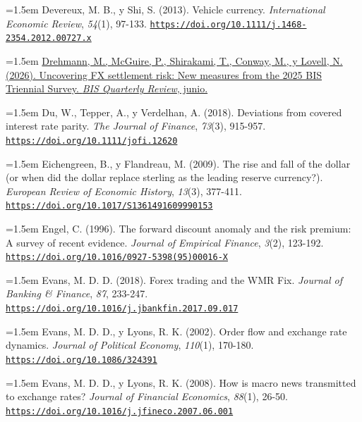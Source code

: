 \documentclass[10pt,a4paper]{article}
\begin{document}
\noindent\hangindent=1.5em Devereux, M. B., y Shi, S. (2013). Vehicle currency. \textit{International Economic Review}, \textit{54}(1), 97-133. \href{https://doi.org/10.1111/j.1468-2354.2012.00727.x}{\nolinkurl{https://doi.org/10.1111/j.1468-2354.2012.00727.x}}

\noindent\hangindent=1.5em \href{https://www.bis.org/publ/qtrpdf/r_qt2606c.htm}{Drehmann, M., McGuire, P., Shirakami, T., Conway, M., y Lovell, N. (2026). Uncovering FX settlement risk: New measures from the 2025 BIS Triennial Survey. \textit{BIS Quarterly Review}, junio.}

\noindent\hangindent=1.5em Du, W., Tepper, A., y Verdelhan, A. (2018). Deviations from covered interest rate parity. \textit{The Journal of Finance}, \textit{73}(3), 915-957. \href{https://doi.org/10.1111/jofi.12620}{\nolinkurl{https://doi.org/10.1111/jofi.12620}}

{\sloppy\noindent\hangindent=1.5em Eichengreen, B., y Flandreau, M. (2009). The rise and fall of the dollar (or when did the dollar replace sterling as the leading reserve currency?). \textit{European Review of Economic History}, \textit{13}(3), 377-411. \href{https://doi.org/10.1017/S1361491609990153}{\nolinkurl{https://doi.org/10.1017/S1361491609990153}}\par}

\noindent\hangindent=1.5em Engel, C. (1996). The forward discount anomaly and the risk premium: A survey of recent evidence. \textit{Journal of Empirical Finance}, \textit{3}(2), 123-192. \href{https://doi.org/10.1016/0927-5398(95)00016-X}{\nolinkurl{https://doi.org/10.1016/0927-5398(95)00016-X}}

\noindent\hangindent=1.5em Evans, M. D. D. (2018). Forex trading and the WMR Fix. \textit{Journal of Banking \& Finance}, \textit{87}, 233-247. \href{https://doi.org/10.1016/j.jbankfin.2017.09.017}{\nolinkurl{https://doi.org/10.1016/j.jbankfin.2017.09.017}}

\noindent\hangindent=1.5em Evans, M. D. D., y Lyons, R. K. (2002). Order flow and exchange rate dynamics. \textit{Journal of Political Economy}, \textit{110}(1), 170-180. \href{https://doi.org/10.1086/324391}{\nolinkurl{https://doi.org/10.1086/324391}}

\noindent\hangindent=1.5em Evans, M. D. D., y Lyons, R. K. (2008). How is macro news transmitted to exchange rates? \textit{Journal of Financial Economics}, \textit{88}(1), 26-50. \href{https://doi.org/10.1016/j.jfineco.2007.06.001}{\nolinkurl{https://doi.org/10.1016/j.jfineco.2007.06.001}}
\end{document}
